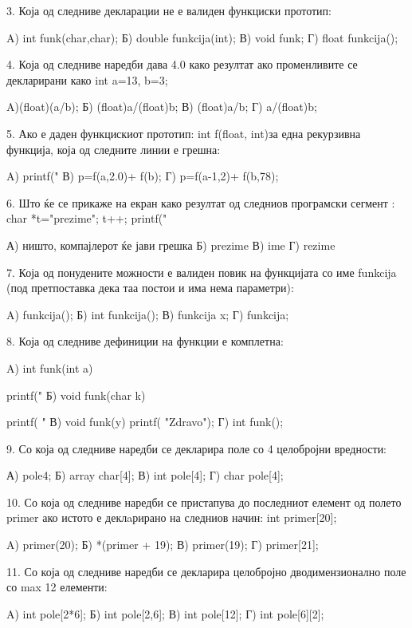 {{{{{3. Која од следниве декларации не е валиден функциски прототип:

A) int funk(char,char);     Б) double funkcija(int);
В) void funk;               Г) float funkcija();

 
4. Која од следниве наредби дава 4.0 како резултат ако променливите се декларирани како int a=13, b=3;

A)(float)(a/b);                         Б) (float)a/(float)b;
В) (float)a/b;                  Г) a/(float)b;

5.  Ако е даден функцискиот прототип: int f(float, int)за една рекурзивна функција, која од следните линии е грешна:

            A) printf("%
В) p=f(a,2.0)+ f(b);                 Г) p=f(a-1,2)+ f(b,78); 



6. Што ќе се прикаже на екран како резултат од следниов програмски сегмент :       char *t="prezime"; t++;  printf("%

А) ништо, компајлерот ќе јави грешка    Б) prezime
В) ime                              Г) rezime

7. Која од понудените можности е валиден повик на функцијата со име funkcija (под претпоставка дека таа постои и има нема параметри):

A) funkcija();                  Б) int funkcija();
В) funkcija x;                          Г) funkcija;

8. Која од следниве дефиниции на функции е комплетна:

A) int funk(int a) { printf("%
Б) void funk(char k) { printf( "%
В) void funk(y) { printf( "Zdravo"); } 
Г) int funk();

9. Со која од следниве наредби се декларира поле со 4 целобројни вредности:

А) pole{4};                        Б) array char[4];
В) int pole[4];                                 Г) char pole[4];

10. Со која од следниве наредби се пристапува до последниот елемент од полето primer ако истото е деклaрирано на следниов начин:  int primer[20];

A)  primer(20);                 Б) *(primer + 19);
В) primer(19);                          Г)  primer[21];

11. Со која од следниве наредби се декларира целобројно дводимензионално поле  со max 12 елементи:

A) int pole[2*6];           Б) int pole[2,6];
В) int pole[12];            Г) int pole[6][2];

}}}}}}}
